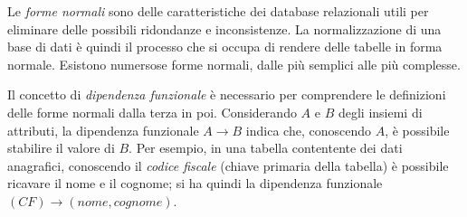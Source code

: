 Le \emph{forme normali} sono delle caratteristiche dei database relazionali utili per eliminare delle possibili ridondanze e inconsistenze. La normalizzazione di una base di dati è quindi il processo che si occupa di rendere delle tabelle in forma normale. Esistono numersose forme normali, dalle più semplici alle più complesse.

Il concetto di \emph{dipendenza funzionale} è necessario per comprendere le definizioni delle forme normali dalla terza in poi. Considerando $A$ e $B$ degli insiemi di attributi, la dipendenza funzionale $A \rightarrow B$ indica che, conoscendo $A$, è possibile stabilire il valore di $B$. Per esempio, in una tabella contentente dei dati anagrafici, conoscendo il \emph{codice fiscale} (chiave primaria della tabella) è possibile ricavare il nome e il cognome; si ha quindi la dipendenza funzionale $(CF) \rightarrow (nome,cognome)$.